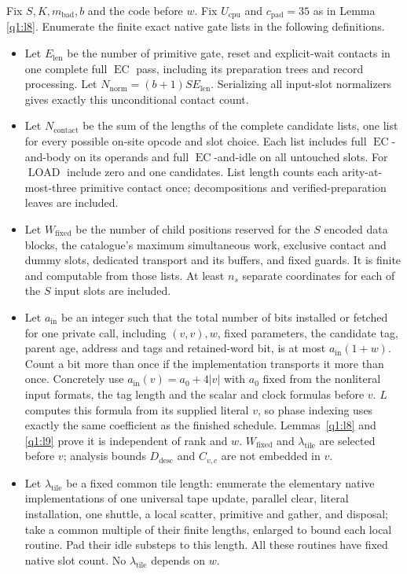 \begin{lemma}\label{q1:l10}


Fix \(S,K,m_{\mathrm{bad}},b\) and the code before \(w\). Fix \(U_{\mathrm{cpu}}\) and \(c_{\mathrm{pad}}=35\) as in Lemma \ref{q1:l8}. Enumerate the finite exact native gate lists in the following definitions.

\begin{itemize}
\item Let \(E_{\mathrm{len}}\) be the number of primitive gate, reset and explicit-wait contacts in one complete full \(\operatorname{EC}\) pass, including its preparation trees and record processing. Let \(N_{\mathrm{norm}}=(b+1)S E_{\mathrm{len}}\). Serializing all input-slot normalizers gives exactly this unconditional contact count.
\item Let \(N_{\mathrm{contact}}\) be the sum of the lengths of the complete candidate lists, one list for every possible on-site opcode and slot choice. Each list includes full \(\operatorname{EC}\)-and-body on its operands and full \(\operatorname{EC}\)-and-idle on all untouched slots. For \(\operatorname{LOAD}\) include zero and one candidates. List length counts each arity-at-most-three primitive contact once; decompositions and verified-preparation leaves are included.
\item Let \(W_{\mathrm{fixed}}\) be the number of child positions reserved for the \(S\) encoded data blocks, the catalogue's maximum simultaneous work, exclusive contact and dummy slots, dedicated transport and its buffers, and fixed guards. It is finite and computable from those lists. At least \(n_{s}\) separate coordinates for each of the \(S\) input slots are included.
\item Let \(a_{\mathrm{in}}\) be an integer such that the total number of bits installed or fetched for one private call, including \((v,v), w\), fixed parameters, the candidate tag, parent age, address and tags and retained-word bit, is at most \(a_{\mathrm{in}}(1+w)\). Count a bit more than once if the implementation transports it more than once. Concretely use \(a_{\mathrm{in}}(v)=a_{0}+4|v|\) with \(a_{0}\) fixed from the nonliteral input formats, the tag length and the scalar and clock formulas before \(v\). \(L\) computes this formula from its supplied literal \(v\), so phase indexing uses exactly the same coefficient as the finished schedule. Lemmas~\ref{q1:l8} and \ref{q1:l9} prove it is independent of rank and \(w\). \(W_{\mathrm{fixed}}\) and \(\lambda_{\mathrm{tile}}\) are selected before \(v\); analysis bounds \(D_{\mathrm{desc}}\) and \(C_{v,c}\) are not embedded in \(v\).
\item Let \(\lambda_{\mathrm{tile}}\) be a fixed common tile length: enumerate the elementary native implementations of one universal tape update, parallel clear, literal installation, one shuttle, a local scatter, primitive and gather, and disposal; take a common multiple of their finite lengths, enlarged to bound each local routine. Pad their idle substeps to this length. All these routines have fixed native slot count. No \(\lambda_{\mathrm{tile}}\) depends on \(w\).
\end{itemize}


\end{lemma}
